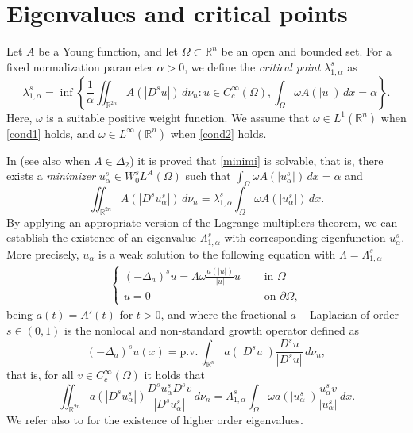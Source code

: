 \documentclass[12pt,reqno]{amsart}
\theoremstyle{definition}
\theoremstyle{remark}
\numberwithin{equation}{section}
\begin{document}
 


\section{Eigenvalues and critical points}
Let $A$ be a Young function, and let $\Omega\subset \mathbb{R}^n$ be an open and bounded set. For a fixed normalization parameter $\alpha>0$, we define the {\em critical point} $\lambda_{1,\alpha}^s$ as
\begin{equation} \label{minimi}
\lambda_{1,\alpha}^s = \inf\left\{\frac{1}{\alpha}\iint_{\mathbb{R}^{2n}} A(|D^s  u|)\, d\nu_n \colon u\in C_c^\infty(\Omega), \int_\Omega  \omega A(|u|)\, dx = \alpha\right\}.
\end{equation}
Here, $\omega$ is a suitable positive weight function. We  assume  that  $\omega\in L^1(\mathbb{R}^n)$ when \eqref{cond1} holds, and $\omega \in L^\infty(\mathbb{R}^n)$ when \eqref{cond2} holds.

In \cite{SV22} (see also \cite{S20} when $A\in \Delta_2$) it is proved that \eqref{minimi} is solvable, that is,  there exists a \emph{minimizer} $u_\alpha^s\in W^{s}_0 L^A(\Omega)$ such that $\int_\Omega \omega A(|u_\alpha^s|)\,dx =\alpha$ and
\begin{equation} \label{eq}
\iint_{\mathbb{R}^{2n}} A(|D^s u_\alpha^s|)\,d\nu_n = \lambda_{1,\alpha}^s \int_\Omega \omega A(|u_\alpha^s|)\,dx.
\end{equation}
By applying an appropriate version of the Lagrange multipliers theorem, we can establish the existence of an eigenvalue $\Lambda_{1,\alpha}^s$ with  corresponding eigenfunction $u_\alpha^s$. More precisely,  $u_\alpha$ is a weak solution to the following equation with $\Lambda=\Lambda_{1,\alpha}^s$
\begin{align}\label{eq1}
\begin{cases}
(-\Delta_a)^s u= \Lambda\omega  \frac{a(|u|)}{|u|} u &\quad \text{ in } \Omega\\
u=0& \quad \text{ on } \partial\Omega,
\end{cases}
\end{align}
being $a(t)=A'(t)$ for $t>0$, and where the fractional $a-$Laplacian of order $s\in (0,1)$ is the nonlocal and non-standard growth operator defined as
$$
(-\Delta_a)^s u (x) = \text{p.v.}\, \int_{\mathbb{R}^n} a(|D^s u|)\frac{D^s u}{|D^s u|}\,d\nu_n,
$$
that is, for all $v\in C^\infty_c(\Omega)$ it holds that
$$
\iint_{\mathbb{R}^{2n}} a(|D^s u_\alpha^s|)\frac{D^s u_\alpha^s D^s v}{|D^s u_\alpha^s|}\, d\nu_n = \Lambda_{1,\alpha}^s \int_\Omega \omega a(|u_\alpha^s|) \frac{u_\alpha^s v}{|u_\alpha^s|}\, dx.
$$
\noindent 
We refer also to \cite{SBO, FBSp24} for the existence of higher order eigenvalues.
\end{document}
